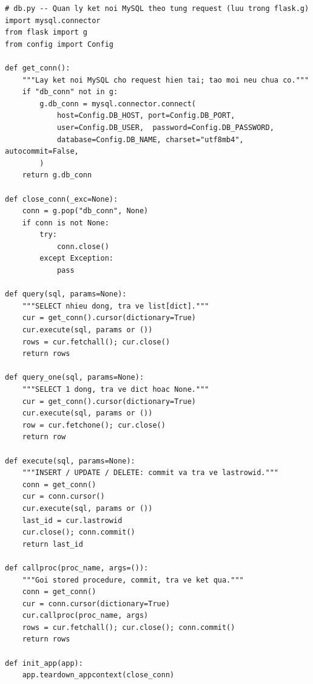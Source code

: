 \documentclass[12pt,a4paper]{report}
\begin{document}
\begin{lstlisting}[style=mypython,
  caption={File \texttt{db.py} -- Lớp truy cập CSDL: quản lý kết nối và các helper query/execute},
  label=lst:python-db]
# db.py -- Quan ly ket noi MySQL theo tung request (luu trong flask.g)
import mysql.connector
from flask import g
from config import Config

def get_conn():
    """Lay ket noi MySQL cho request hien tai; tao moi neu chua co."""
    if "db_conn" not in g:
        g.db_conn = mysql.connector.connect(
            host=Config.DB_HOST, port=Config.DB_PORT,
            user=Config.DB_USER,  password=Config.DB_PASSWORD,
            database=Config.DB_NAME, charset="utf8mb4", autocommit=False,
        )
    return g.db_conn

def close_conn(_exc=None):
    conn = g.pop("db_conn", None)
    if conn is not None:
        try:
            conn.close()
        except Exception:
            pass

def query(sql, params=None):
    """SELECT nhieu dong, tra ve list[dict]."""
    cur = get_conn().cursor(dictionary=True)
    cur.execute(sql, params or ())
    rows = cur.fetchall(); cur.close()
    return rows

def query_one(sql, params=None):
    """SELECT 1 dong, tra ve dict hoac None."""
    cur = get_conn().cursor(dictionary=True)
    cur.execute(sql, params or ())
    row = cur.fetchone(); cur.close()
    return row

def execute(sql, params=None):
    """INSERT / UPDATE / DELETE: commit va tra ve lastrowid."""
    conn = get_conn()
    cur = conn.cursor()
    cur.execute(sql, params or ())
    last_id = cur.lastrowid
    cur.close(); conn.commit()
    return last_id

def callproc(proc_name, args=()):
    """Goi stored procedure, commit, tra ve ket qua."""
    conn = get_conn()
    cur = conn.cursor(dictionary=True)
    cur.callproc(proc_name, args)
    rows = cur.fetchall(); cur.close(); conn.commit()
    return rows

def init_app(app):
    app.teardown_appcontext(close_conn)
\end{lstlisting}
\end{document}
